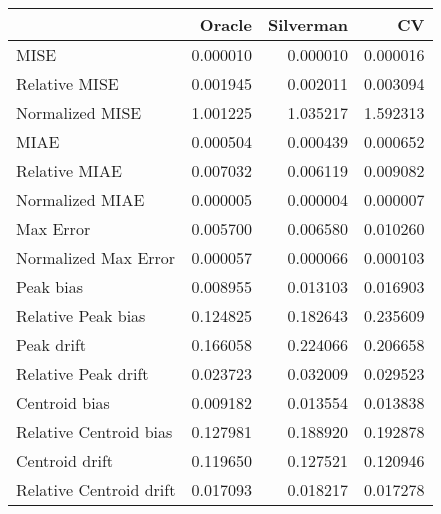 \begin{tabular}{lrrr}
  \hline
 & Oracle & Silverman & CV \\ 
  \hline
MISE & 0.000010 & 0.000010 & 0.000016 \\ 
  Relative MISE & 0.001945 & 0.002011 & 0.003094 \\ 
  Normalized MISE & 1.001225 & 1.035217 & 1.592313 \\ 
  MIAE & 0.000504 & 0.000439 & 0.000652 \\ 
  Relative MIAE & 0.007032 & 0.006119 & 0.009082 \\ 
  Normalized MIAE & 0.000005 & 0.000004 & 0.000007 \\ 
  Max Error & 0.005700 & 0.006580 & 0.010260 \\ 
  Normalized Max Error & 0.000057 & 0.000066 & 0.000103 \\ 
  Peak bias & 0.008955 & 0.013103 & 0.016903 \\ 
  Relative Peak bias & 0.124825 & 0.182643 & 0.235609 \\ 
  Peak drift & 0.166058 & 0.224066 & 0.206658 \\ 
  Relative Peak drift & 0.023723 & 0.032009 & 0.029523 \\ 
  Centroid bias & 0.009182 & 0.013554 & 0.013838 \\ 
  Relative Centroid bias & 0.127981 & 0.188920 & 0.192878 \\ 
  Centroid drift & 0.119650 & 0.127521 & 0.120946 \\ 
  Relative Centroid drift & 0.017093 & 0.018217 & 0.017278 \\ 
   \hline
\end{tabular}
